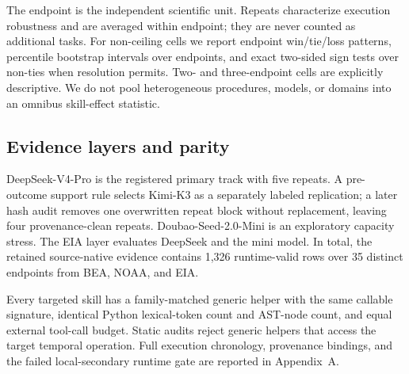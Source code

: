 The endpoint is the independent scientific unit. Repeats characterize execution robustness and are averaged within endpoint; they are never counted as additional tasks. For non-ceiling cells we report endpoint win/tie/loss patterns, percentile bootstrap intervals over endpoints, and exact two-sided sign tests over non-ties when resolution permits. Two- and three-endpoint cells are explicitly descriptive. We do not pool heterogeneous procedures, models, or domains into an omnibus skill-effect statistic.

\subsection{Evidence layers and parity}
DeepSeek-V4-Pro is the registered primary track with five repeats. A pre-outcome support rule selects Kimi-K3 as a separately labeled replication; a later hash audit removes one overwritten repeat block without replacement, leaving four provenance-clean repeats. Doubao-Seed-2.0-Mini is an exploratory capacity stress. The EIA layer evaluates DeepSeek and the mini model. In total, the retained source-native evidence contains 1,326 runtime-valid rows over 35 distinct endpoints from BEA, NOAA, and EIA.

Every targeted skill has a family-matched generic helper with the same callable signature, identical Python lexical-token count and AST-node count, and equal external tool-call budget. Static audits reject generic helpers that access the target temporal operation. Full execution chronology, provenance bindings, and the failed local-secondary runtime gate are reported in Appendix~A.
